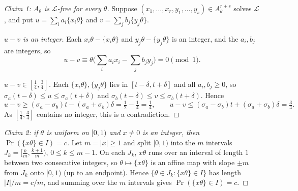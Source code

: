 \documentclass[a4paper,12pt]{article}
\newcommand{\card}[1]{\left| #1 \right|}
\newcommand{\mb}[1]{\mathbb{#1}}
\newcommand{\mc}[1]{\mathcal{#1}}
\begin{document}
\begin{proof}[Claim 1: $A_\theta$ is $\mc L$-free for every $\theta$]
	Suppose $(x_1, \hdots, x_r, y_1, \hdots, y_s) \in A_\theta^{r+s}$ solves $\mc L$, and put $u = \sum_{i} a_i \{x_i \theta\}$ and $v = \sum_j b_j \{y_j \theta\}$.

	\emph{$u - v$ is an integer.} Each $x_i \theta - \{x_i \theta\}$ and $y_j \theta - \{ y_j \theta \}$ is an integer, and the $a_i, b_j$ are integers, so
	\[
		u - v \equiv \theta \Big( \sum_i a_i x_i - \sum_j b_j y_j \Big) = 0 \pmod 1.
	\]

	\emph{$u - v \in [\frac14, \frac34]$.} Each $\{x_i\theta\}, \{y_j \theta\}$ lies in $[t - \delta, t + \delta]$ and all $a_i, b_j \ge 0$, so $\sigma_a (t - \delta) \le u \le \sigma_a (t + \delta)$ and $\sigma_b (t - \delta) \le v \le \sigma_b (t + \delta)$. Hence
	\[
		u - v \ge (\sigma_a - \sigma_b) t - (\sigma_a + \sigma_b) \delta = \tfrac12 - \tfrac14 = \tfrac14, \qquad u - v \le (\sigma_a - \sigma_b) t + (\sigma_a + \sigma_b) \delta = \tfrac34.
	\]
	As $[\frac14, \frac34]$ contains no integer, this is a contradiction.
\end{proof}

\begin{center}
\end{center}

\begin{proof}[Claim 2: if $\theta$ is uniform on {$[0,1)$} and $x \neq 0$ is an integer, then $\Pr(\{x\theta\} \in I) = c$]
	Let $m = \card{x} \ge 1$ and split $[0,1)$ into the $m$ intervals $J_k = [\frac km, \frac{k+1}{m})$, $0 \le k \le m-1$. On each $J_k$, $x\theta$ runs over an interval of length $1$ between two consecutive integers, so $\theta \mapsto \{x\theta\}$ is an affine map with slope $\pm m$ from $J_k$ onto $[0,1)$ (up to an endpoint). Hence $\{ \theta \in J_k : \{x \theta\} \in I \}$ has length $\card{I} / m = c/m$, and summing over the $m$ intervals gives $\Pr(\{x\theta\} \in I) = c$.
\end{proof}
\end{document}
